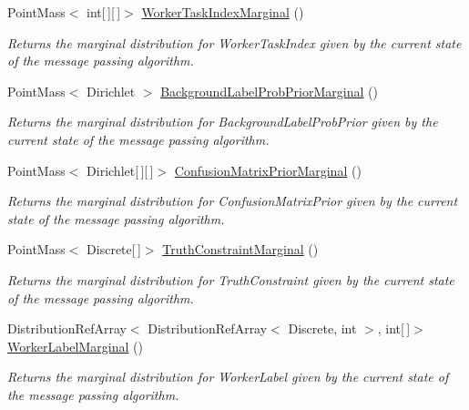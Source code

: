 \begin{DoxyCompactItemize}
Point\+Mass$<$ int\mbox{[}$\,$\mbox{]}\mbox{[}$\,$\mbox{]}$>$ \hyperlink{class_microsoft_research_1_1_infer_1_1_models_1_1_user_1_1_model___e_p_a4010e430a8925a46d7a7098952773582}{Worker\+Task\+Index\+Marginal} ()
\begin{DoxyCompactList}\small\item\em Returns the marginal distribution for \textquotesingle{}Worker\+Task\+Index\textquotesingle{} given by the current state of the message passing algorithm. \end{DoxyCompactList}\item 
Point\+Mass$<$ Dirichlet $>$ \hyperlink{class_microsoft_research_1_1_infer_1_1_models_1_1_user_1_1_model___e_p_a217cb08f450040b58535d623bd7fa6b0}{Background\+Label\+Prob\+Prior\+Marginal} ()
\begin{DoxyCompactList}\small\item\em Returns the marginal distribution for \textquotesingle{}Background\+Label\+Prob\+Prior\textquotesingle{} given by the current state of the message passing algorithm. \end{DoxyCompactList}\item 
Point\+Mass$<$ Dirichlet\mbox{[}$\,$\mbox{]}\mbox{[}$\,$\mbox{]}$>$ \hyperlink{class_microsoft_research_1_1_infer_1_1_models_1_1_user_1_1_model___e_p_a31f2762b98ace26fd1659e251faf6379}{Confusion\+Matrix\+Prior\+Marginal} ()
\begin{DoxyCompactList}\small\item\em Returns the marginal distribution for \textquotesingle{}Confusion\+Matrix\+Prior\textquotesingle{} given by the current state of the message passing algorithm. \end{DoxyCompactList}\item 
Point\+Mass$<$ Discrete\mbox{[}$\,$\mbox{]}$>$ \hyperlink{class_microsoft_research_1_1_infer_1_1_models_1_1_user_1_1_model___e_p_a388fd0698994fcdf0afde5e07338fd6c}{Truth\+Constraint\+Marginal} ()
\begin{DoxyCompactList}\small\item\em Returns the marginal distribution for \textquotesingle{}Truth\+Constraint\textquotesingle{} given by the current state of the message passing algorithm. \end{DoxyCompactList}\item 
Distribution\+Ref\+Array$<$ Distribution\+Ref\+Array$<$ Discrete, int $>$, int\mbox{[}$\,$\mbox{]}$>$ \hyperlink{class_microsoft_research_1_1_infer_1_1_models_1_1_user_1_1_model___e_p_a8c09b2fe4a6625f7afd6b860187268af}{Worker\+Label\+Marginal} ()
\begin{DoxyCompactList}\small\item\em Returns the marginal distribution for \textquotesingle{}Worker\+Label\textquotesingle{} given by the current state of the message passing algorithm. \end{DoxyCompactList}\end{DoxyCompactItemize}
